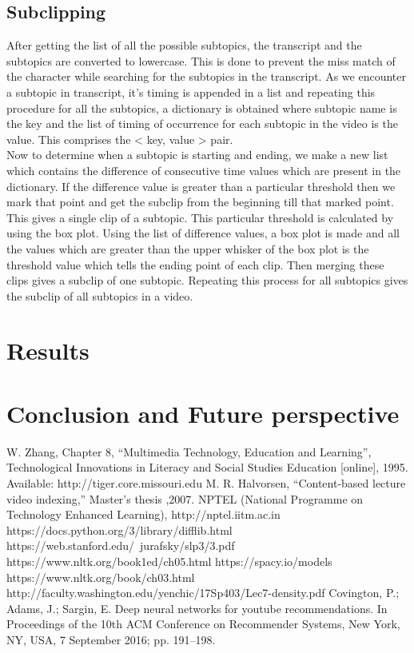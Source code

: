\documentclass[conference]{IEEEtran}
\begin{document}
\subsection{Subclipping}
After getting the list of all the possible subtopics, the transcript and the subtopics are converted to lowercase. This is done to prevent the miss match of the character while searching for the subtopics in the transcript. As we encounter a subtopic in transcript, it’s timing is appended in a list and repeating this procedure for all the subtopics, a dictionary is obtained where subtopic name is the key and the list of timing of occurrence for each subtopic in the video is the value. This comprises the < key, value > pair.\\
\indent Now to determine when a subtopic is starting and ending, we make a new list which contains the difference of consecutive time values which are present in the dictionary. If the difference value is greater than a particular threshold then we mark that point and get the subclip from the beginning till that marked point. This gives a single clip of a subtopic. This particular threshold is calculated by using the box plot. Using the list of difference values, a box plot is made and all the values which are greater than the upper whisker of the box plot is the threshold value which tells the ending point of each clip. Then merging these clips gives a subclip of one subtopic. Repeating this process for all subtopics gives the subclip of all subtopics in a video.


\section{Results}

\section{Conclusion and Future perspective}
\begin{thebibliography}{9}
W. Zhang, Chapter 8, “Multimedia Technology, Education and Learning”, Technological Innovations in Literacy and Social Studies Education [online], 1995. Available: http://tiger.core.missouri.edu 
M. R. Halvorsen, “Content-based lecture video indexing,” Master’s thesis ,2007.
NPTEL (National Programme on Technology Enhanced Learning), http://nptel.iitm.ac.in
https://docs.python.org/3/library/difflib.html
https://web.stanford.edu/~jurafsky/slp3/3.pdf
https://www.nltk.org/book1ed/ch05.html
https://spacy.io/models
https://www.nltk.org/book/ch03.html
http://faculty.washington.edu/yenchic/17Sp403/Lec7-density.pdf
Covington, P.; Adams, J.; Sargin, E. Deep neural networks for youtube recommendations. In Proceedings of the 10th ACM Conference on Recommender Systems, New York, NY, USA, 7 September 2016; pp. 191–198.
\end{thebibliography}
\end{document}
